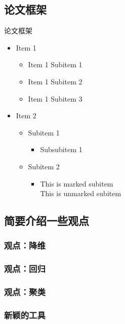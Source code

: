 \documentclass[aspectratio=169, 9pt]{beamer}
\begin{document}
\subsection{论文框架}
\begin{frame}{论文框架}
    \begin{itemize}
     \setlength{\itemsep}{10pt}
        \item Item 1
        \begin{itemize}
            \item Item 1 Subitem 1
            \item Item 1 Subitem 2
            \item Item 1 Subitem 3
        \end{itemize}
        \item Item 2
        \begin{itemize}
            \item Subitem 1
            \begin{itemize}
                \item Subsubitem 1
            \end{itemize}
            \item Subitem 2
            \begin{itemize}
                \item This is marked subitem \\
                This is unmarked subitem
            \end{itemize}
        \end{itemize}
    \end{itemize}
\end{frame}

\subsection{简要介绍一些观点}
\subsubsection{观点：降维}
\subsubsection{观点：回归}
\subsubsection{观点：聚类}
\subsubsection{新颖的工具}
\end{document}
